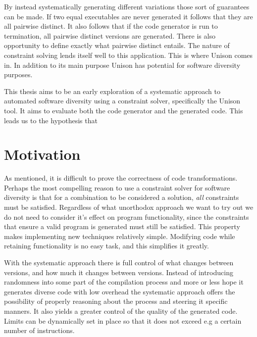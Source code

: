 By instead systematically generating different variations those sort of guarantees can be
made. If two equal executables are never generated it follows that they are all pairwise
distinct. It also follows that if the code generator is run to termination, all pairwise
distinct versions are generated. There is also opportunity to define exactly what pairwise
distinct entails. The nature of constraint solving lends itself well to this application.
This is where Unison comes in. In addition to its main purpose Unison has potential for
software diversity purposes.

This thesis aims to be an early exploration of a systematic approach to automated software
diversity using a constraint solver, specifically the Unison tool. It aims to evaluate
both the code generator and the generated code. This leads us to the hypothesis that


\section{Motivation}

As mentioned, it is difficult to prove the correctness of code transformations. Perhaps
the most compelling reason to use a constraint solver for software diversity is that for
a combination to be considered a solution, \textit{all} constraints must be satisfied.
Regardless of what unorthodox approach we want to try out we do not need to consider it's
effect on program functionality, since the constraints that ensure a valid program is
generated must still be satisfied. This property makes implementing new techniques
relatively simple. Modifying code while retaining functionality is no easy task, and this
simplifies it greatly.

With the systematic approach there is full control of what changes between versions, and
how much it changes between versions. Instead of introducing randomness into some part of
the compilation process and more or less hope it generates diverse code with low overhead
the systematic approach offers the possibility of properly reasoning about the process and
steering it specific manners. It also yields a greater control of the quality of the
generated code. Limits can be dynamically set in place so that it does not exceed e.g a
certain number of instructions.

